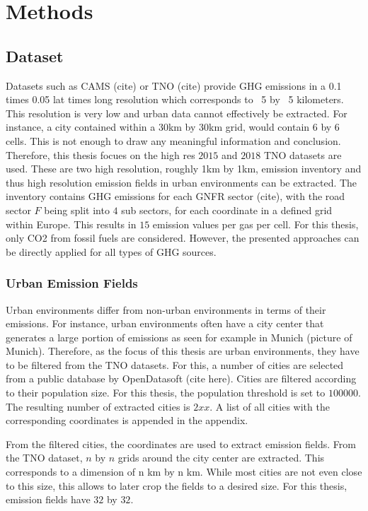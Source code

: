 
\chapter{Methods}\label{chapter:methods}

\section{Dataset}
Datasets such as CAMS (cite) or TNO (cite) provide GHG emissions in a 0.1 times 0.05 lat times long resolution which corresponds to ~5 by ~5 kilometers.
This resolution is very low and urban data cannot effectively be extracted.
For instance, a city contained within a 30km by 30km grid, would contain 6 by 6 cells.
This is not enough to draw any meaningful information and conclusion. 
Therefore, this thesis focues on the high res $2015$ and $2018$ TNO datasets are used.
These are two high resolution, roughly 1km by 1km, emission inventory and thus high resolution emission fields in urban environments can be extracted.
The inventory contains GHG emissions for each GNFR sector (cite), with the road sector $F$ being split into $4$ sub sectors, for each coordinate in a defined grid within Europe.
This results in $15$ emission values per gas per cell.
For this thesis, only CO2 from fossil fuels are considered.
However, the presented approaches can be directly applied for all types of GHG sources.

\subsection{Urban Emission Fields}
Urban environments differ from non-urban environments in terms of their emissions.
For instance, urban environments often have a city center that generates a large portion of emissions as seen for example in Munich (picture of Munich).
Therefore, as the focus of this thesis are urban environments, they have to be filtered from the TNO datasets.
For this, a number of cities are selected from a public database by OpenDatasoft (cite here).
Cities are filtered according to their population size.
For this thesis, the population threshold is set to $100000$.
The resulting number of extracted cities is $2xx$.
A list of all cities with the corresponding coordinates is appended in the appendix.

From the filtered cities, the coordinates are used to extract emission fields.
From the TNO dataset, $n$ by $n$ grids around the city center are extracted.
This corresponds to a dimension of n km by n km.
While most cities are not even close to this size, this allows to later crop the fields to a desired size.
For this thesis, emission fields have $32$ by $32$.


